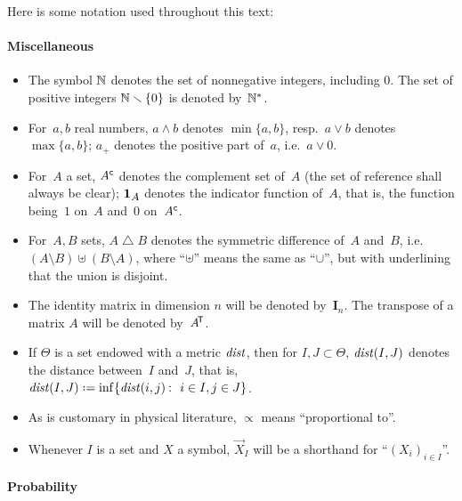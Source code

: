 Here is some notation used throughout this text:

\paragraph{Miscellaneous}

\begin{itemize}
\item The symbol $\mathbb{N}$ denotes the set of nonnegative integers, including $0$.
The set of positive integers $\mathbb{N}\smallsetminus\{0\}$ is denoted by~$\mathbb{N}^*$.
%
\item For~$a,b$ real numbers, $a\wedge b$ denotes $\min\{a,b\}$,
resp.~$a\vee b$ denotes $\max\{a,b\}$; $a_+$ denotes the positive part of~$a$,
i.e.\ $a\vee0$.
%
\item For~$A$ a set, $A^{\mathsf{c}}$ denotes the complement set of~$A$
(the set of reference shall always be clear);
$\1{A}$ denotes the indicator function of~$A$,
that is, the function being~$1$ on~$A$ and~$0$ on~$A^{\mathsf{c}}$.
%
\item For~$A,B$ sets, $A\bigtriangleup B$ denotes the symmetric difference of~$A$ and~$B$,
i.e.\ ${(A\setminus B)}\uplus(B\setminus A)$,
where ``$\uplus$'' means the same as ``$\cup$'', but with underlining that the union is disjoint.
%
\item The identity matrix in dimension $n$ will be denoted by~$\mathbf{I}_n$.
The transpose of a matrix $A$ will be denoted by~$A^{\mathsf{\!T}}$.
%
\item If $\Theta$ is a set endowed with a metric $\mathit{dist}$, then for
$I,J\subset\Theta$, $\mathit{dist}(I,J)$ denotes the distance between~$I$ and~$J$, that is,
$\dist(I,J) \coloneqq \inf\{\dist(i,j) \colon {i\in I}, \ab {j\in J}\}$.
%
\item As is customary in physical literature, $\propto$ means ``proportional to''.
%
\item Whenever $I$ is a set and $X$ a symbol,
$\vec{X}_I$ will be a shorthand for ``$(X_i)_{i\in I}$''.
\end{itemize}


\paragraph{Probability}


